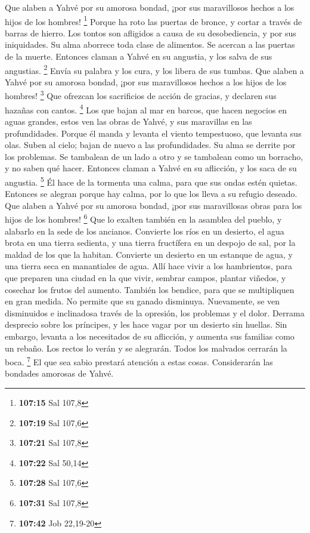 \begin{paracol}{2}
 Que alaben a Yahvé por su amorosa bondad, ¡por sus
maravillosos hechos a los hijos de los hombres! \footnote{\textbf{107:15}
  Sal 107,8}  Porque ha roto las puertas de bronce, y
cortar a través de barras de hierro.  Los tontos son
afligidos a causa de su desobediencia, y por sus iniquidades.
 Su alma aborrece toda clase de alimentos. Se acercan a
las puertas de la muerte.  Entonces claman a Yahvé en su
angustia, y los salva de sus angustias. \footnote{\textbf{107:19} Sal
  107,6}  Envía su palabra y los cura, y los libera de
sus tumbas.  Que alaben a Yahvé por su amorosa bondad,
¡por sus maravillosos hechos a los hijos de los hombres! \footnote{\textbf{107:21}
  Sal 107,8}  Que ofrezcan los sacrificios de acción de
gracias, y declaren sus hazañas con cantos. \footnote{\textbf{107:22}
  Sal 50,14}  Los que bajan al mar en barcos, que hacen
negocios en aguas grandes,  estos ven las obras de Yahvé,
y sus maravillas en las profundidades.  Porque él manda y
levanta el viento tempestuoso, que levanta sus olas. 
Suben al cielo; bajan de nuevo a las profundidades. Su alma se derrite
por los problemas.  Se tambalean de un lado a otro y se
tambalean como un borracho, y no saben qué hacer. 
Entonces claman a Yahvé en su aflicción, y los saca de su angustia.
\footnote{\textbf{107:28} Sal 107,6}  Él hace de la
tormenta una calma, para que sus ondas estén quietas. 
Entonces se alegran porque hay calma, por lo que los lleva a su refugio
deseado.  Que alaben a Yahvé por su amorosa bondad, ¡por
sus maravillosas obras para los hijos de los hombres! \footnote{\textbf{107:31}
  Sal 107,8}  Que lo exalten también en la asamblea del
pueblo, y alabarlo en la sede de los ancianos.  Convierte
los ríos en un desierto, el agua brota en una tierra sedienta,
 y una tierra fructífera en un despojo de sal, por la
maldad de los que la habitan.  Convierte un desierto en
un estanque de agua, y una tierra seca en manantiales de agua.
 Allí hace vivir a los hambrientos, para que preparen una
ciudad en la que vivir,  sembrar campos, plantar viñedos,
y cosechar los frutos del aumento.  También los bendice,
para que se multipliquen en gran medida. No permite que su ganado
disminuya.  Nuevamente, se ven disminuidos e inclinadosa
través de la opresión, los problemas y el dolor.  Derrama
desprecio sobre los príncipes, y les hace vagar por un desierto sin
huellas.  Sin embargo, levanta a los necesitados de su
aflicción, y aumenta sus familias como un rebaño.  Los
rectos lo verán y se alegrarán. Todos los malvados cerrarán la boca.
\footnote{\textbf{107:42} Job 22,19-20}  El que sea sabio
prestará atención a estas cosas. Considerarán las bondades amorosas de
Yahvé.


\end{paracol}
